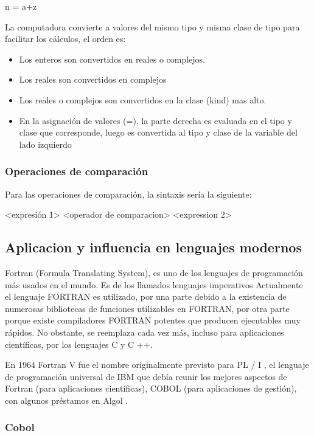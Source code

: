 \hspace{2cm}n = a+z

La computadora convierte  a valores del mismo tipo y misma clase de tipo para facilitar los cálculos, el orden es: 

\begin{itemize}
\item Los enteros son convertidos en reales o complejos.
\item Los reales son convertidos en complejos
\item Los reales o complejos son convertidos en la clase (kind) mas alto.
\item En la asignación de valores (=), la parte derecha es evaluada en el tipo y clase que corresponde, luego es convertida al tipo y clase de la variable del lado izquierdo
\end{itemize}
\subsubsection{Operaciones de comparación}
Para  las operaciones de comparación, la sintaxis sería la siguiente:

\hspace{2cm} <expresión 1> <operador de comparacion> <expression 2>




\subsection{Aplicacion y influencia en lenguajes modernos}

Fortran (Formula Translating System), es uno de los lenguajes de programación más usados en el mundo. Es de los llamados lenguajes imperativos Actualmente el lenguaje FORTRAN es utilizado, por una parte debido a la existencia de numerosas bibliotecas de funciones utilizables en FORTRAN, por otra parte porque existe compiladores FORTRAN potentes que producen ejecutables muy rápidos. No obstante, se reemplaza cada vez más, incluso para aplicaciones científicas, por los lenguajes C y C ++.

\vspace{0.2in}

En 1964 Fortran V fue el nombre originalmente previsto para PL / I , el lenguaje de programación universal de IBM que debía reunir los mejores aspectos de Fortran (para aplicaciones científicas), COBOL (para aplicaciones de gestión), con algunos préstamos en Algol .

\subsubsection{Cobol}

